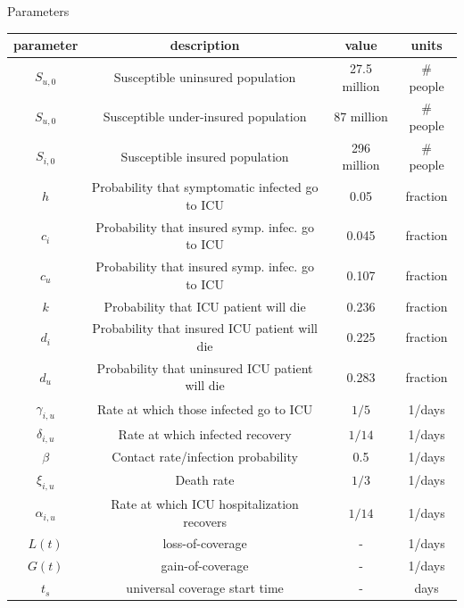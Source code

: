 \documentclass[notes]{beamer}
\begin{document}
\begin{frame}[shrink=25]{Parameters}

\begin{tabular}{|c|c|c|c|}
    \hline
    \textbf{parameter} & \textbf{description} & \textbf{value} & \textbf{units} \\
    \hline
    $S_{u,0}$ & Susceptible uninsured population & 27.5 million & \# people\\
    \hline
    $S_{u,0}$ & Susceptible under-insured population & 87 million & \# people\\
    \hline
    $S_{i,0}$ & Susceptible insured population & 296 million & \# people\\
    \hline
    $h$ & Probability that symptomatic infected go to ICU & 0.05 & fraction \\
    \hline
    $c_{i}$ & Probability that insured symp. infec. go to ICU & 0.045 & fraction \\
    \hline
    $c_{u}$ & Probability that insured symp. infec. go to ICU & 0.107 & fraction \\
    \hline
    $k$ & Probability that ICU patient will die & 0.236 & fraction \\
    \hline
    $d_{i}$ & Probability that insured ICU patient will die & 0.225 & fraction\\
    \hline
    $d_{u}$ & Probability that uninsured ICU patient will die & 0.283 & fraction \\
    \hline
    $\gamma_{i,u}$ & Rate at which those infected go to ICU & $1/5$ & 1/days \\
    \hline
   $\delta_{i,u}$ & Rate at which infected recovery & $1/14$ & 1/days\\
    \hline
    $\beta$ & Contact rate/infection probability & 0.5 & 1/days \\
    \hline
    $\xi_{i,u}$ & Death rate & $1/3$ & 1/days \\
    \hline
    $\alpha_{i,u}$ & Rate at which ICU hospitalization recovers & $1/14$ & 1/days\\
    \hline
    $L(t)$ & loss-of-coverage & - & 1/days  \\
    \hline
    $G(t)$ & gain-of-coverage & - & 1/days \\
    \hline
      $t_s$ & universal coverage start time & - & days \\

    \hline
    \end{tabular}

\end{frame}
\end{document}
